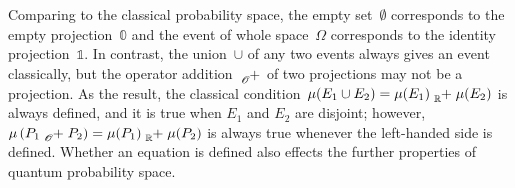 \documentclass{article}
\theoremstyle{remark}
\newcommand{\pmeas}{\ensuremath{\mu}}
\begin{document}
Comparing to the classical probability space, the empty set~$\emptyset$
corresponds to the empty projection~$\mathbb{0}$ and the event of
whole space~$\Omega$ corresponds to the identity projection~$\mathbb{1}$.
In contrast, the union~$\cup$ of any two events always gives an
event classically, but the operator addition~$\tensor*[_{\mathscr{O}}]{+}{}$
of two projections may not be a projection. As the result, the classical
condition~$\pmeas(E_{1}\cup E_{2})=\pmeas(E_{1})\tensor*[_{\mathbb{R}}]{+}{}\pmeas(E_{2})$
is always defined, and it is true when $E_{1}$ and $E_{2}$ are disjoint;
however, $\mu\left(P_{1}\tensor*[_{\mathscr{O}}]{+}{}P_{2}\right)=\mu(P_{1})\tensor*[_{\mathbb{R}}]{+}{}\mu(P_{2})$
is always true whenever the left-handed side is defined. Whether an equation
is defined also effects the further properties of quantum probability
space.
\end{document}
